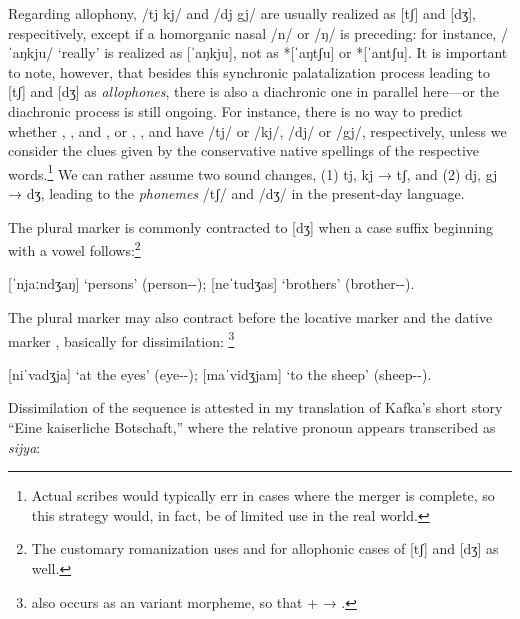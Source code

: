Regarding allophony, /tj kj/ and /dj gj/ are usually realized as [tʃ] and [dʒ], 
respecitively, except if a homorganic nasal /n/ or /ŋ/ is preceding: for 
instance,  /ˈaŋkju/ `really' is realized as [ˈaŋkju], not as 
*[ˈaŋtʃu] or *[ˈantʃu]. It is important to note, however, that besides this 
synchronic palatalization process leading to [tʃ] and [dʒ] as \emph{allophones}, 
there is also a diachronic one in parallel here---or the diachronic process is 
still ongoing. For instance, there is no way to predict whether 
, , 
and , or , 
, and  have /tj/ or /kj/, /dj/ 
or /gj/, respectively, unless we consider the clues given by the conservative 
native spellings of the respective words.\footnote{Actual scribes would 
typically err in cases where the merger is complete, so this strategy would, in 
fact, be of limited use in the real world.} We can rather assume two sound 
changes, (1) tj, kj → tʃ, and (2) dj, gj → dʒ, leading to the \emph{phonemes} 
/tʃ/ and /dʒ/ in the present-day language.

The plural marker  is commonly contracted to [dʒ] when a case 
suffix beginning with a vowel follows:\footnote{The customary romanization uses 
 and  for allophonic cases of [tʃ] and [dʒ] as well.}

\pex
	\a {} [ˈnjaːndʒaŋ] `persons' (person-\Pl{}-\Aarg{});
	\a {} [neˈtudʒas] `brothers' (brother-\Pl{}-\Parg{}).
\xe

The plural marker may also contract before the locative marker 
and the dative marker , basically for dissimilation:%
\footnote{ also occurs as an variant morpheme, so that 
 +  → .}

\pex
	\a {} [niˈvadʒja] `at the eyes' (eye-\Pl{}-\Loc{});
	\a {} [maˈvidʒjam] `to the sheep' (sheep-\Pl{}-\Dat{}).
\xe

Dissimilation of the sequence  is attested in my translation 
of Kafka's short story ``Eine kaiserliche Botschaft,'' where the relative 
pronoun  appears transcribed as \textit{sijya}:

